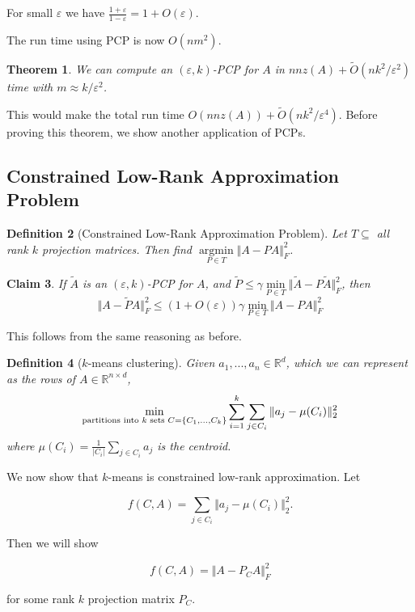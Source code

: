 \documentclass[11pt]{article}
\newcommand{\eps}{\varepsilon}
\newcommand{\R}{\mathbb{R}}
\newcommand{\tn}{\textnormal}
\DeclareMathOperator*{\argmin}{argmin}
\newtheorem{theorem}{Theorem}
\newtheorem{definition}[theorem]{Definition}
\newtheorem{claim}[theorem]{Claim}
\begin{document}
For small $\eps$ we have $\frac{1+\eps}{1-\eps} = 1+O(\eps)$.

The run time using PCP is now $O(nm^2)$.

\begin{theorem}
We can compute an $(\eps,k)$-PCP for $A$ in $nnz(A) + \tilde{O}(nk^2/\eps^2)$ time with $m \approx k/\eps^2$.
\end{theorem}

This would make the total run time $O(nnz(A)) + \tilde{O}(nk^2/\eps^4)$. Before proving this theorem, we show another application of PCPs.

\subsection{Constrained Low-Rank Approximation Problem}

\begin{definition}[Constrained Low-Rank Approximation Problem]
Let $T \subseteq$ all rank $k$ projection matrices. Then find $\argmin\limits_{P \in T} \Vert A - PA \Vert_F^2$.
\end{definition}

\begin{claim}
If  $\tilde{A}$ is an $(\eps,k)$-PCP for $A$, and $\tilde{P} \leq \gamma \min\limits_{P \in T} \Vert \tilde{A} - P\tilde{A} \Vert_F^2$, then
$$
\Vert A - \tilde{P} A \Vert_F^2 \leq (1 + O(\eps)) \gamma \min\limits_{P \in T} \Vert A - PA \Vert_F^2
$$
\end{claim}

This follows from the same reasoning as before.

\begin{definition}[$k$-means clustering]
Given $a_1,...,a_n \in \R^d$, which we can represent as the rows of $A \in \R^{n \times d}$,
$$
\min\limits_{\tn{partitions into }k\tn{ sets }C = \{C_1,...,C_k\}} \sum\limits_{i=1}^k \sum\limits_{j \in C_i} \Vert a_j - \mu(C_i)\Vert_2^2
$$
where $\mu(C_i) = \frac{1}{|C_i|} \sum\limits_{j \in C_i} a_j$ is the centroid.
\end{definition}

We now show that $k$-means is constrained low-rank approximation. Let

\[
f(C,A) = \sum\limits_{j \in C_i} \Vert a_j - \mu(C_i)\Vert_2^2.
\]

Then we will show

\[
f(C,A) = \Vert A - P_C A \Vert_F^2
\]

for some rank $k$ projection matrix $P_C$.
\end{document}
